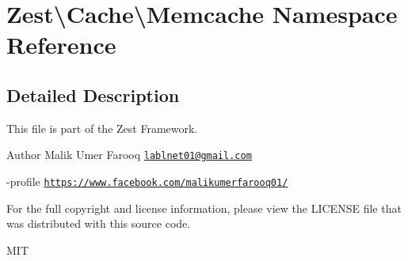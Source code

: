 \hypertarget{namespace_zest_1_1_cache_1_1_memcache}{}\section{Zest\textbackslash{}Cache\textbackslash{}Memcache Namespace Reference}
\label{namespace_zest_1_1_cache_1_1_memcache}


\subsection{Detailed Description}
This file is part of the Zest Framework.

\begin{DoxyAuthor}{Author}
Malik Umer Farooq \href{mailto:lablnet01@gmail.com}{\tt lablnet01@gmail.\+com} 

-\/profile \href{https://www.facebook.com/malikumerfarooq01/}{\tt https\+://www.\+facebook.\+com/malikumerfarooq01/}
\end{DoxyAuthor}
For the full copyright and license information, please view the L\+I\+C\+E\+N\+SE file that was distributed with this source code.

M\+IT 